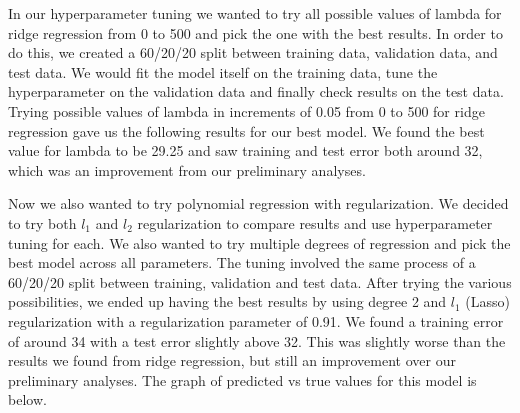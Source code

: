 \documentclass{article}
\begin{document}
In our hyperparameter tuning we wanted to try all possible values of lambda for ridge regression from 0 to 500 and pick the one with the best results. In order to do this, we created a 60/20/20 split between training data, validation data, and test data. We would fit the model itself on the training data, tune the hyperparameter on the validation data and finally check results on the test data. Trying possible values of lambda in increments of 0.05 from 0 to 500 for ridge regression gave us the following results for our best model. We found the best value for lambda to be 29.25 and saw training and test error both around 32, which was an improvement from our preliminary analyses.

Now we also wanted to try polynomial regression with regularization. We decided to try both \(l_1\) and \(l_2\) regularization to compare results and use hyperparameter tuning for each. We also wanted to try multiple degrees of regression and pick the best model across all parameters. The tuning involved the same process of a 60/20/20 split between training, validation and test data. After trying the various possibilities, we ended up having the best results by using degree 2 and \(l_1\) (Lasso) regularization with a regularization parameter of 0.91. We found a training error of around 34 with a test error slightly above 32. This was slightly worse than the results we found from ridge regression, but still an improvement over our preliminary analyses. The graph of predicted vs true values for this model is below.
\end{document}
